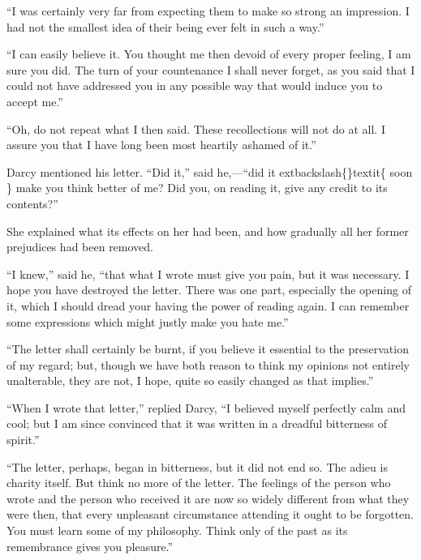 \documentclass[10pt]{book}
\begin{document}
   “I was certainly very far from expecting them to make so strong an
impression. I had not the smallest idea of their being ever felt in such
a way.”
  

   “I can easily believe it. You thought me then devoid of every proper
feeling, I am sure you did. The turn of your countenance I shall never
forget, as you said that I could not have addressed you in any possible
way that would induce you to accept me.”
  

   “Oh, do not repeat what I then said. These recollections will not do at
all. I assure you that I have long been most heartily ashamed of it.”
  

   Darcy mentioned his letter. “Did it,” said he,—“did it
   	extbackslash\{\}textit\{
    soon
   \}
   make you
think better of me? Did you, on reading it, give any credit to its
contents?”
  

   She explained what its effects on her had been, and how gradually all
her former prejudices had been removed.
  

   “I knew,” said he, “that what I wrote must give you pain, but it was
necessary. I hope you have destroyed the letter. There was one part,
especially the opening of it, which I should dread your having the power
of
   reading again. I can remember some expressions which might justly
make you hate me.”
  

   “The letter shall certainly be burnt, if you believe it essential to the
preservation of my regard; but, though we have both reason to think my
opinions not entirely unalterable, they are not, I hope, quite so easily
changed as that implies.”
  

   “When I wrote that letter,” replied Darcy, “I believed myself perfectly
calm and cool; but I am since convinced that it was written in a
dreadful bitterness of spirit.”
  

   “The letter, perhaps, began in bitterness, but it did not end so. The
adieu is charity itself. But think no more of the letter. The feelings
of the person who wrote and the person who received it are now so widely
different from what they were then, that every unpleasant circumstance
attending it ought to be forgotten. You must learn some of my
philosophy. Think only of the past as its remembrance gives you
pleasure.”
  
\end{document}
